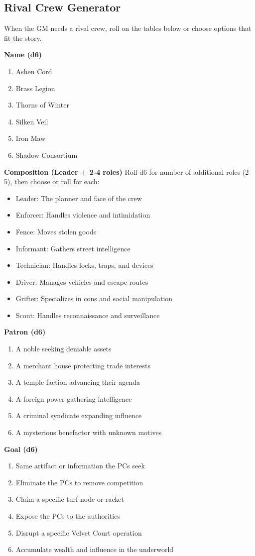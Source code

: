 \documentclass[10pt,twoside]{book}
\begin{document}
\subsection{Rival Crew Generator}
When the GM needs a rival crew, roll on the tables below or choose options that fit the story.

\noindent\textbf{Name (d6)}
\begin{enumerate}
\item Ashen Cord
\item Brass Legion
\item Thorns of Winter
\item Silken Veil
\item Iron Maw
\item Shadow Consortium
\end{enumerate}

\noindent\textbf{Composition (Leader + 2-4 roles)}
Roll d6 for number of additional roles (2-5), then choose or roll for each:
\begin{itemize}
\item Leader: The planner and face of the crew
\item Enforcer: Handles violence and intimidation
\item Fence: Moves stolen goods
\item Informant: Gathers street intelligence
\item Technician: Handles locks, traps, and devices
\item Driver: Manages vehicles and escape routes
\item Grifter: Specializes in cons and social manipulation
\item Scout: Handles reconnaissance and surveillance
\end{itemize}

\noindent\textbf{Patron (d6)}
\begin{enumerate}
\item A noble seeking deniable assets
\item A merchant house protecting trade interests
\item A temple faction advancing their agenda
\item A foreign power gathering intelligence
\item A criminal syndicate expanding influence
\item A mysterious benefactor with unknown motives
\end{enumerate}

\noindent\textbf{Goal (d6)}
\begin{enumerate}
\item Same artifact or information the PCs seek
\item Eliminate the PCs to remove competition
\item Claim a specific turf node or racket
\item Expose the PCs to the authorities
\item Disrupt a specific Velvet Court operation
\item Accumulate wealth and influence in the underworld
\end{enumerate}
\end{document}
